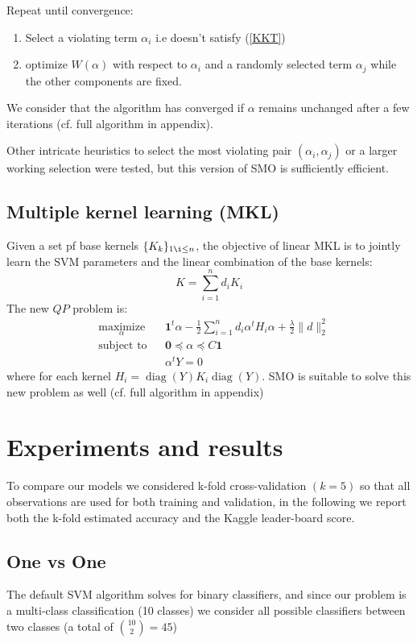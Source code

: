 \documentclass{acmsiggraph}
\DeclareMathOperator\diag{diag}
\newcommand{\1}{\mathbf{1}}
\newcommand{\0}{\mathbf{0}}
\begin{document}
Repeat until convergence:
\begin{enumerate}
\item Select a violating term $\alpha_i$ i.e doesn't satisfy (\ref{KKT})
\item optimize $W(\alpha)$ with respect to $\alpha_i$ and a randomly selected term $\alpha_j$ while the other components are fixed.
\end{enumerate}

We consider that the algorithm has converged if $\alpha$ remains unchanged after a few iterations (cf. full algorithm in appendix).

Other intricate heuristics to select the most violating pair $(\alpha_i,\alpha_j)$ or a larger working selection were tested, but this version of SMO is sufficiently efficient.

\subsection{Multiple kernel learning (MKL)}
Given a set pf base kernels $\{K_k\}_{1\i\leq n}$, the objective of linear MKL is to jointly learn the SVM parameters and the linear combination of the base kernels:
\[K = \sum_{i=1}^nd_iK_i\]
The new $QP$ problem is:
\begin{equation}
\label{QP2}
\tag{QP2}
\begin{aligned}
& \underset{\alpha}{\text{maximize}} & & \1^t\alpha - \frac{1}{2}\sum_{i=1}^n
d_i\alpha^tH_i\alpha + \frac{\lambda}{2}\|d\|_2^2\\
& \text{subject to} & & \0\preceq \alpha \preceq C\1\\
& & & \alpha^tY = 0
\end{aligned}
\end{equation}
where for each kernel $H_i= \diag(Y)K_i\diag(Y)$. SMO is suitable to solve this new problem as well (cf. full algorithm in appendix)

\section{Experiments and results}
To compare our models we considered k-fold cross-validation $(k=5)$ so that all observations are used for both training and validation, in the following we report both the k-fold estimated accuracy and the Kaggle leader-board score.
\subsection{One vs One}
The default SVM algorithm solves for binary classifiers, and since our problem is a multi-class classification (10 classes) we consider all possible classifiers between two classes (a total of ${10 \choose 2}=45$)
\end{document}
